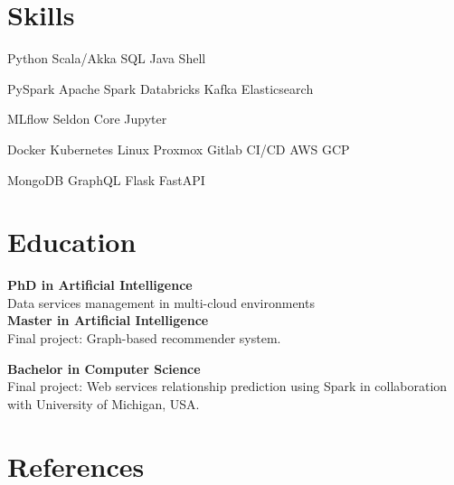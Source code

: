 \documentclass[english]{plushcv}
\begin{document}
\hfill
\begin{minipage}[t]{0.23\textwidth}

\section{Skills}
\sectionsep
{}
Python \textbullet{} Scala/Akka \textbullet{} SQL \textbullet{} Java \textbullet{} Shell \\
\sectionsep

PySpark \textbullet{} Apache Spark \textbullet{} Databricks \textbullet{} Kafka \textbullet{} Elasticsearch \\
\sectionsep

MLflow \textbullet{} Seldon Core \textbullet{} Jupyter \\
\sectionsep

Docker \textbullet{} Kubernetes \textbullet{} Linux \textbullet{} Proxmox \textbullet{} Gitlab CI/CD \textbullet{} AWS \textbullet{} GCP \\
\sectionsep

MongoDB \textbullet{} GraphQL \textbullet{} Flask \textbullet{} FastAPI \\

\sectionsep

\section{Education}
\sectionsep
\sectionsep

\textbf{PhD in Artificial Intelligence} \\
Data services management in multi-cloud environments \\

\sectionsep
\textbf{Master in Artificial Intelligence} \\
Final project: Graph-based recommender system.

\sectionsep
\textbf{Bachelor in Computer Science} \\
Final project: Web services relationship prediction using Spark in collaboration with University of Michigan, USA.
\sectionsep

\section{References}


\end{minipage}
\end{document}
